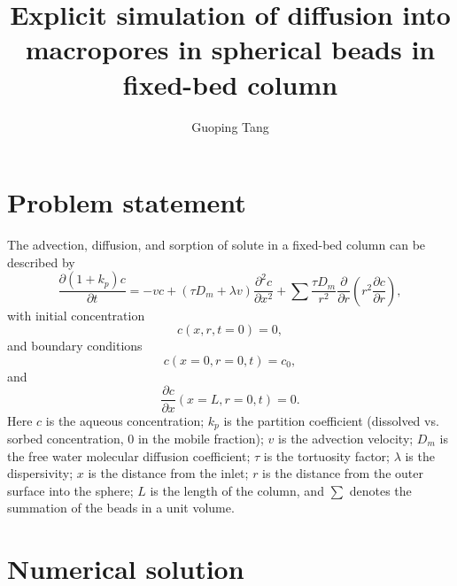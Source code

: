 \documentclass{article}
\title{Explicit simulation of diffusion into macropores in spherical beads in fixed-bed column}
\author{Guoping Tang}
\begin{document}
   \maketitle

\section{Problem statement}
The advection, diffusion, and sorption of solute in a fixed-bed column can be described by 
\begin{equation}
\frac{\partial (1 + k_p) c}{\partial t} = - vc + (\tau D_m + \lambda v) \frac{\partial^2 c}{\partial x^2} + \sum \frac{\tau D_m}{r^2}\frac{\partial }{\partial
r}\left(r^2\frac{\partial c}{\partial r}\right), 
\label{eq:ade}
\end{equation}
with initial concentration 
\begin{equation}
c(x, r, t=0) = 0,
\end{equation}
and boundary conditions
\begin{equation}
c(x=0, r = 0,t) = c_0,
\end{equation}
and
\begin{equation}
\frac{\partial c}{\partial x} (x=L, r=0,t) = 0.
\end{equation}
Here $c$ is the aqueous concentration; $k_p$ is the partition coefficient (dissolved vs. sorbed concentration, 0 in the mobile fraction); $v$ is the advection velocity; $D_m$ is the free water molecular diffusion coefficient; $\tau$ is the tortuosity factor; $\lambda$ is the dispersivity; $x$ is the distance from the inlet; $r$ is the distance from the outer surface into the sphere; $L$ is the length of the column, and $\sum$ denotes the summation of the beads in a unit volume. 

\section{Numerical solution}
\end{document}

